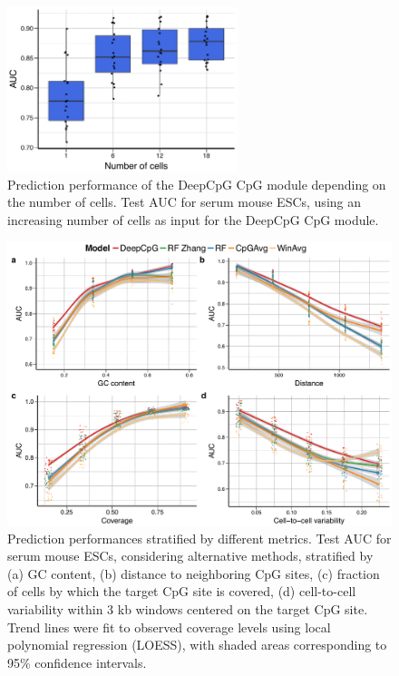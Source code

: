\begin{figure}[htbp!]
\centering
\includegraphics[width=0.6\textwidth]{cpg_module}
\caption[Prediction performance of the DeepCpG CpG module depending on the number of cells.]{Prediction performance of the DeepCpG CpG module depending on the number of cells. Test AUC for serum mouse ESCs, using an increasing number of cells as input for the DeepCpG CpG module.}
\label{fig:dcpg_eval_cpg_module}
\end{figure}

\begin{figure}[htbp!]
\centering
\includegraphics[width=1.0\textwidth]{stats}
\caption[Prediction performances stratified by different metrics.]{Prediction performances stratified by different metrics. Test AUC for serum mouse ESCs, considering alternative methods, stratified by (a) GC content, (b) distance to neighboring CpG sites, (c) fraction of cells by which the target CpG site is covered, (d) cell-to-cell variability within 3 kb windows centered on the target CpG site. Trend lines were fit to observed coverage levels using local polynomial regression (LOESS), with shaded areas corresponding to 95\% confidence intervals.}
\label{fig:dcpg_eval_stats}
\end{figure}
